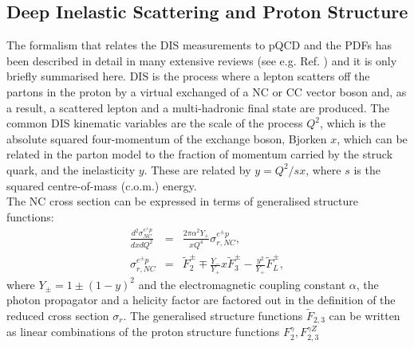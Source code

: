 


\subsection{Deep Inelastic Scattering and Proton Structure}
\label{dissection}


The for\-ma\-lism that relates the DIS measurements to pQCD and the PDFs has been described
in detail in many extensive reviews (see e.g. Ref. \cite{disbook}) and it is only briefly summarised here.
DIS is the process where a lepton scatters off the partons in the proton
by a virtual exchanged of a NC or CC vector boson and, as a result, a scattered lepton and a 
multi-hadronic final state are produced.
The common DIS kinematic variables are the scale of the process $Q^2$, which is the absolute squared four-momentum of 
the exchange boson, Bjorken $x$, 
which can be related in the parton model to 
the fraction of momentum carried by the struck quark, 
and the inelasticity $y$. These are related by $y=Q^2/sx$, where $s$ is the squared centre-of-mass (c.o.m.) energy.
\\
%
The NC cross section can be expressed in terms of generalised structure functions:
\begin{eqnarray}
    \frac{d^2\sigma_{NC}^{e^{\pm} p}}{dxdQ^2}&=&\frac{2\pi\alpha^2 Y_{+}}{xQ^4} \sigma_{r,NC}^{e^{\pm} p},\\ 
    \sigma_{r,NC}^{e^{\pm} p}&= &  \tilde F_2^{\pm} \mp \frac{Y_{-}}{Y_{+}}x \tilde F_3^{\pm} - \frac{y^2}{Y_{+}} \tilde F_L^{\pm},
\end{eqnarray}
where  $Y_{\pm} = 1 \pm (1-y)^2$ and the electromagnetic coupling constant $\alpha$, 
the photon propagator and a helicity factor are factored out in the definition of the reduced cross section $\sigma_r$.
The generalised structure functions $\tilde F_{2,3}$ 
can be written as linear combinations of the proton structure functions $F^{\gamma}_2, F^{\gamma Z}_{2,3}$ 
